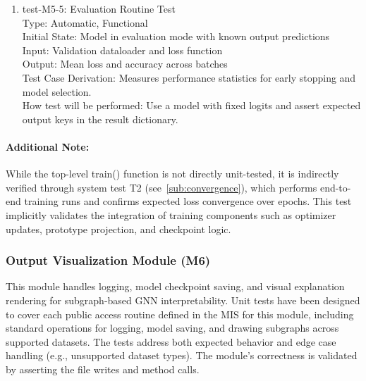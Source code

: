 \documentclass[12pt, titlepage]{article}
\begin{document}
\begin{enumerate}
\item{test-M5-5: Evaluation Routine Test\\}
Type: Automatic, Functional \\
Initial State: Model in evaluation mode with known output predictions \\
Input: Validation dataloader and loss function \\
Output: Mean loss and accuracy across batches \\
Test Case Derivation: Measures performance statistics for early stopping and model selection. \\
How test will be performed: Use a model with fixed logits and assert expected output keys in the result dictionary.

\end{enumerate}

\paragraph{Additional Note:}
While the top-level train() function is not directly unit-tested, it is indirectly verified through system test T2 (see~\ref{sub:convergence}), which performs end-to-end training runs and confirms expected loss convergence over epochs. This test implicitly validates the integration of training components such as optimizer updates, prototype projection, and checkpoint logic.




\subsubsection{Output Visualization Module (M6)}

This module handles logging, model checkpoint saving, and visual explanation rendering for subgraph-based GNN interpretability. Unit tests have been designed to cover each public access routine defined in the MIS for this module, including standard operations for logging, model saving, and drawing subgraphs across supported datasets. The tests address both expected behavior and edge case handling (e.g., unsupported dataset types). The module’s correctness is validated by asserting the file writes and method calls.
\end{document}

